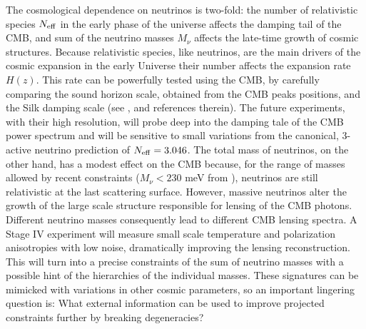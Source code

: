\documentclass[aps,prd,reprint,superscriptaddress]{revtex4-1}
\begin{document}
The cosmological dependence on neutrinos is two-fold: the number of relativistic species $N_{\rm eff}$ in the early phase of the universe affects the damping tail of the CMB, and sum of the neutrino masses $M_{\nu}$ affects the late-time growth of cosmic structures.
Because relativistic species, like neutrinos, are the main drivers of the cosmic expansion in the early Universe their number affects the expansion rate $H(z)$. This rate can be powerfully tested using the CMB, by carefully comparing the sound horizon scale, obtained from the CMB peaks positions, and the Silk damping scale (see \cite{2013arXiv1309.5383A}, \cite{2013PhRvD..87h3008H} and references therein). 
The future experiments, with their high resolution, will probe deep into the damping tale of the CMB power spectrum and will be sensitive to small variations from the canonical, 3-active neutrino prediction of $N_{\rm eff}=3.046$. The total mass of neutrinos, on the other hand, has a modest effect on the CMB because, for the range of masses allowed by recent constraints ($M_{\nu}<230$ meV from \cite{2014A&A...571A..16P}), neutrinos are still relativistic at the last scattering surface. However, massive neutrinos alter the growth of the large scale structure responsible for lensing of the CMB photons. Different neutrino masses consequently lead to different CMB lensing spectra. A Stage IV experiment will measure small scale temperature and polarization anisotropies with low noise, dramatically improving the lensing reconstruction. This will turn into a  precise constraints of the sum of neutrino masses with a possible hint of the hierarchies of the individual masses. These signatures can be mimicked with variations in other cosmic parameters, so an important lingering question is: What external information can be used to improve projected constraints further by breaking degeneracies?
\end{document}
